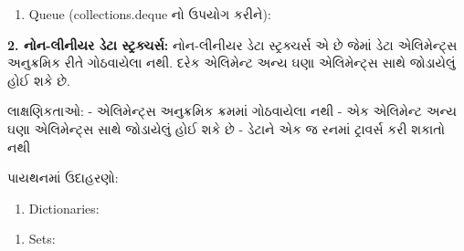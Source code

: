 \begin{enumerate}
\def\labelenumi{\alph{enumi})}
\setcounter{enumi}{4}
\tightlist
\item
  Queue (collections.deque નો ઉપયોગ કરીને):
\end{enumerate}

\begin{Shaded}
\begin{Highlighting}[]
\OperatorTok{=}\NormalTok{ deque([}\NormalTok{, }\NormalTok{, }\NormalTok{])}
\NormalTok{)}
\end{Highlighting}
\end{Shaded}

\textbf{2. નોન-લીનીયર ડેટા સ્ટ્રક્ચર્સ:} નોન-લીનીયર ડેટા સ્ટ્રક્ચર્સ એ છે જેમાં ડેટા
એલિમેન્ટ્સ અનુક્રમિક રીતે ગોઠવાયેલા નથી. દરેક એલિમેન્ટ અન્ય ઘણા એલિમેન્ટ્સ સાથે જોડાયેલું
હોઈ શકે છે.

લાક્ષણિકતાઓ: - એલિમેન્ટ્સ અનુક્રમિક ક્રમમાં ગોઠવાયેલા નથી - એક એલિમેન્ટ અન્ય ઘણા
એલિમેન્ટ્સ સાથે જોડાયેલું હોઈ શકે છે - ડેટાને એક જ રનમાં ટ્રાવર્સ કરી શકાતો નથી

પાયથનમાં ઉદાહરણો:

\begin{enumerate}
\def\labelenumi{\alph{enumi})}
\tightlist
\item
  Dictionaries:
\end{enumerate}

\begin{Shaded}
\begin{Highlighting}[]
\OperatorTok{=}\NormalTok{ \{}\NormalTok{: }\NormalTok{, }\NormalTok{: }\NormalTok{\}}
\NormalTok{(person[}\NormalTok{])  }
\end{Highlighting}
\end{Shaded}

\begin{enumerate}
\def\labelenumi{\alph{enumi})}
\setcounter{enumi}{1}
\tightlist
\item
  Sets:
\end{enumerate}

